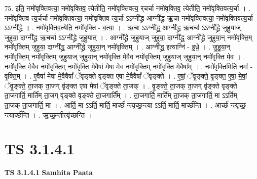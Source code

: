 \documentclass[17pt]{extarticle}
\begin{document}
75. इति॒ नमो॑वृक्तिवत्या॒ नमो॑वृक्तिव॒ त्येतीति॒ नमो॑वृक्तिवत्य॒ र्‌चर्चा नमो॑वृक्तिव॒ त्येतीति॒ नमो॑वृक्तिवत्य॒र्चा । . नमो॑वृक्तिव त्य॒र्चर्चा नमो॑वृक्तिवत्या॒ नमो॑वृक्तिव त्य॒र्चा ऽऽग्नी᳚द्ध्र॒ आग्नी᳚द्ध्र ऋ॒चा नमो॑वृक्तिवत्या॒ नमो॑वृक्तिवत्य॒र्चा ऽऽग्नी᳚द्ध्रे । . नमो॑वृक्तिव॒त्येति॒ नमो॑वृक्ति - व॒त्या॒ । . ऋ॒चा ऽऽग्नी᳚द्ध्र॒ आग्नी᳚द्ध्र ऋ॒चर्चा ऽऽग्नी᳚द्ध्रे जुहुयाज् जुहुया॒ दाग्नी᳚द्ध्र ऋ॒चर्चा ऽऽग्नी᳚द्ध्रे जुहुयात् । . आग्नी᳚द्ध्रे जुहुयाज् जुहुया॒ दाग्नी᳚द्ध्र॒ आग्नी᳚द्ध्रे जुहुया॒न् नमो॑वृक्ति॒म् नमो॑वृक्तिम् जुहुया॒ दाग्नी᳚द्ध्र॒ आग्नी᳚द्ध्रे जुहुया॒न् नमो॑वृक्तिम् । . आग्नी᳚द्ध्र॒ इत्याग्नि॑ - इ॒ध्रे॒ । . जु॒हु॒या॒न् नमो॑वृक्ति॒म् नमो॑वृक्तिम् जुहुयाज् जुहुया॒न् नमो॑वृक्ति मे॒वैव नमो॑वृक्तिम् जुहुयाज् जुहुया॒न् नमो॑वृक्ति मे॒व । . नमो॑वृक्ति मे॒वैव नमो॑वृक्ति॒म् नमो॑वृक्ति मे॒वैषा॑ मेषा मे॒व नमो॑वृक्ति॒म् नमो॑वृक्ति मे॒वैषा᳚म् । . नमो॑वृक्ति॒मिति॒ नमः॑ - वृ॒क्ति॒म् । . ए॒वैषा॑ मेषा मे॒वैवैषां᳚ ॅवृङ्क्ते वृङ्क्त एषा मे॒वैवैषां᳚ ॅवृङ्क्ते । . ए॒षां॒ ॅवृ॒ङ्क्ते॒ वृ॒ङ्क्त॒ ए॒षा॒ मे॒षां॒ ॅवृ॒ङ्क्ते॒ ता॒जक् ता॒जग् वृ॑ङ्क्त एषा मेषां ॅवृङ्क्ते ता॒जक् । . वृ॒ङ्क्ते॒ ता॒जक् ता॒जग् वृ॑ङ्क्ते वृङ्क्ते ता॒जगार्ति॒ मार्ति॑म् ता॒जग् वृ॑ङ्क्ते वृङ्क्ते ता॒जगार्ति᳚म् । . ता॒जगार्ति॒ मार्ति॑म् ता॒जक् ता॒जगार्ति॒ मा ऽऽर्ति॑म् ता॒जक् ता॒जगार्ति॒ मा । . आर्ति॒ मा ऽऽर्ति॒ मार्ति॒ मार्च्छ॑ न्त्यृच्छ॒न्त्या ऽऽर्ति॒ मार्ति॒ मार्च्छ॑न्ति । . आर्च्छ॑ न्त्यृच्छ॒ न्त्यार्च्छ॑न्ति । . ऋ॒च्छ॒न्तीत्यृ॑च्छन्ति । \newline
\pagebreak
{}

\section{ TS 3.1.4.1 }

\textbf{TS 3.1.4.1 } \newline
\textbf{Samhita Paata} \newline
\end{document}
